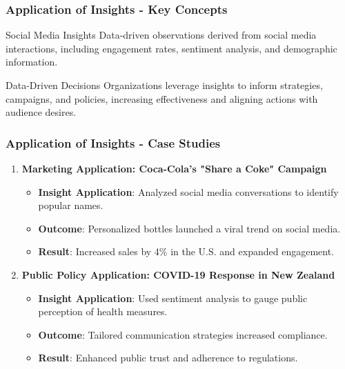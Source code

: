 \documentclass{beamer}
\begin{document}
\begin{frame}[fragile]
    \frametitle{Application of Insights - Key Concepts}
    \begin{block}{Social Media Insights}
        Data-driven observations derived from social media interactions, including engagement rates, sentiment analysis, and demographic information.
    \end{block}

    \begin{block}{Data-Driven Decisions}
        Organizations leverage insights to inform strategies, campaigns, and policies, increasing effectiveness and aligning actions with audience desires.
    \end{block}    
\end{frame}

\begin{frame}[fragile]
    \frametitle{Application of Insights - Case Studies}
    \begin{enumerate}
        \item \textbf{Marketing Application: Coca-Cola's "Share a Coke" Campaign}
            \begin{itemize}
                \item \textbf{Insight Application}: Analyzed social media conversations to identify popular names.
                \item \textbf{Outcome}: Personalized bottles launched a viral trend on social media.
                \item \textbf{Result}: Increased sales by 4\% in the U.S. and expanded engagement.
            \end{itemize}

        \item \textbf{Public Policy Application: COVID-19 Response in New Zealand}
            \begin{itemize}
                \item \textbf{Insight Application}: Used sentiment analysis to gauge public perception of health measures.
                \item \textbf{Outcome}: Tailored communication strategies increased compliance.
                \item \textbf{Result}: Enhanced public trust and adherence to regulations.
            \end{itemize}
    \end{enumerate}
\end{frame}
\end{document}
